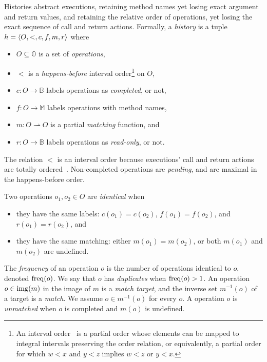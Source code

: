 Histories abstract executions, retaining method
names yet losing exact argument and return values, and retaining the relative
order of operations, yet losing the exact sequence of call and return actions.
Formally, a \emph{history} is a tuple $h = {\left\langle{O,<,c,f,m,r}\right\rangle}$ where
\begin{itemize}

  \item $O \subseteq \mathbb{O}$ is a set of \emph{operations},

  \item $<$ is a \emph{happens-before} interval order\footnote{An interval
  order~\cite{books/Fishburn85} is a partial order whose elements can be mapped
  to integral intervals preserving the order relation, or equivalently, a
  partial order for which $w < x$ and $y < z$ implies $w < z$ or $y < x$.} on
  $O$,

  \item $c: O \to \mathbb{B}$ labels operations as \emph{completed}, or not,

  \item $f: O \to \mathbb{M}$ labels operations with method names,

  \item $m: O \rightharpoonup O$ is a partial \emph{matching} function, and

  \item $r: O \to \mathbb{B}$ labels operations as \emph{read-only}, or not.

\end{itemize}
The relation $<$ is an interval order because executions’ call and return
actions are totally ordered~\cite{conf/popl/BouajjaniEEH15}. Non-completed
operations are \emph{pending}, and are maximal in the happens-before order.

Two operations $o_1, o_2 \in O$ are \emph{identical} when
\begin{itemize}

  \item they have the same labels: $c(o_1) = c(o_2)$, $f(o_1)= f(o_2)$, and
  $r(o_1) = r(o_2)$, and

  \item they have the same matching: either $m(o_1) = m(o_2)$, or both $m(o_1)$
  and $m(o_2)$ are undefined.

\end{itemize}
The \emph{frequency} of an operation $o$ is the number of operations identical
to $o$, denoted $\operatorname{freq}(o)$. We say that $o$ has \emph{duplicates} when
$\operatorname{freq}(o) > 1$. An operation $o \in \operatorname{img}(m)$ in the image of $m$ is a
\emph{match target}, and the inverse set $m^{-1}(o)$ of a target is a
\emph{match}. We assume $o \in m^{-1}(o)$ for every $o$. A operation $o$ is \emph{unmatched}
when $o$ is completed and $m(o)$ is undefined.

